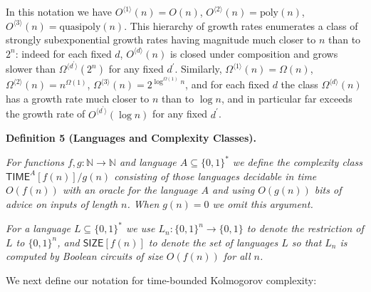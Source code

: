 \documentclass[10pt,a4paper]{article}
\begin{document}



In this notation we have $O^{\langle 1\rangle}(n)=O(n)$, $O^{\langle 2\rangle}(n)=\mathrm{poly}(n)$, $O^{\langle 3\rangle}(n)=\mathrm{quasipoly}(n)$. This hierarchy of growth rates enumerates a class of strongly subexponential growth rates having magnitude much closer to $n$ than to $2^{n}$: indeed for each fixed $d$, $O^{\langle d\rangle}(n)$ is closed under composition and grows slower than $\Omega^{\langle d^{\prime}\rangle}(2^{n})$ for any fixed $d^{\prime}$.
Similarly, $\Omega^{\langle 1\rangle}(n)=\Omega(n)$, $\Omega^{\langle 2\rangle}(n)=n^{\Omega(1)}$, $\Omega^{\langle 3\rangle}(n)=2^{\log^{\Omega(1)}n}$, and for each fixed $d$ the class $\Omega^{\langle d\rangle}(n)$ has a growth rate much closer to $n$ than to $\log n$, and in particular far exceeds the growth rate of $O^{\langle d^{\prime}\rangle}(\log n)$ for any fixed $d^{\prime}$.\par





\par\medskip\noindent\textbf{
\textbf{Definition 5}\textbf{ }(Languages and Complexity Classes)\textbf{.}
}\par



\emph{For functions $f,g:\mathbb{N}\to\mathbb{N}$ and language $A\subseteq\{0,1\}^{*}$ we define the complexity class ${\mathsf{TIME}}^{A}[f(n)]/g(n)$ consisting of those languages decidable in time $O(f(n))$ with an oracle for the language $A$ and using $O(g(n))$ bits of advice on inputs of length $n$. When $g(n)=0$ we omit this argument.}\par




\emph{For a language $L\subseteq\{0,1\}^{*}$ we use $L_{n}:\{0,1\}^{n}\to\{0,1\}$ to denote the restriction of $L$ to $\{0,1\}^{n}$, and ${\mathsf{SIZE}}[f(n)]$ to denote the set of languages $L$ so that $L_{n}$ is computed by Boolean circuits of size $O(f(n))$ for all $n$.}\par






We next define our notation for time-bounded Kolmogorov complexity:\par
\end{document}
